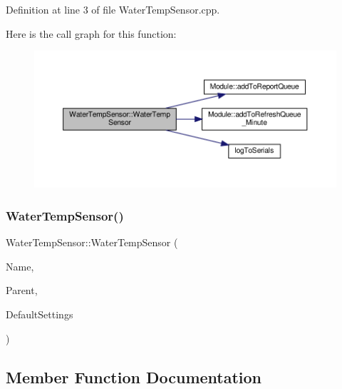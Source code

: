Definition at line 3 of file Water\+Temp\+Sensor.\+cpp.

Here is the call graph for this function\+:
\nopagebreak
\begin{figure}[H]
\begin{center}
\leavevmode
\includegraphics[width=350pt]{class_water_temp_sensor_a88e6058500175b82a043ad682f968011_cgraph}
\end{center}
\end{figure}
\mbox{\label{class_water_temp_sensor_a88e6058500175b82a043ad682f968011}} 
\subsubsection{\texorpdfstring{Water\+Temp\+Sensor()}{WaterTempSensor()}\hspace{0.1cm}{\footnotesize\ttfamily [2/2]}}
{\footnotesize\ttfamily Water\+Temp\+Sensor\+::\+Water\+Temp\+Sensor (\begin{DoxyParamCaption}\item[{const \+\_\+\+\_\+\+Flash\+String\+Helper $\ast$}]{Name,  }\item[{\hyperlink{class_module}{Module} $\ast$}]{Parent,  }\item[{\hyperlink{struct_settings_1_1_water_temp_sensor_settings}{Settings\+::\+Water\+Temp\+Sensor\+Settings} $\ast$}]{Default\+Settings }\end{DoxyParamCaption})}



\subsection{Member Function Documentation}
\mbox{\label{class_water_temp_sensor_a8643876189e7bbc303bc7f4f7da66f19}} 
